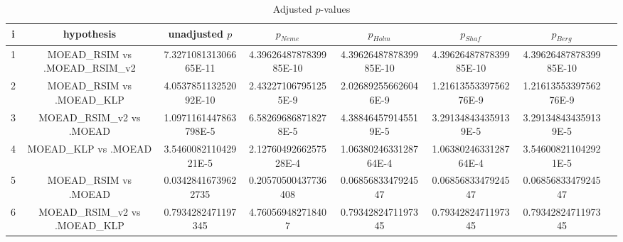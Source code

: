 \documentclass[a4paper,10pt]{article}
\begin{document}
\begin{landscape}
\begin{table}[!htp]
\centering\tiny
\caption{Adjusted $p$-values}
\begin{tabular}{cccccccc}
i&hypothesis&unadjusted $p$&$p_{Neme}$&$p_{Holm}$&$p_{Shaf}$&$p_{Berg}$\\
\hline
1&MOEAD_RSIM vs .MOEAD_RSIM_v2&7.327108131306665E-11&4.3962648787839985E-10&4.3962648787839985E-10&4.3962648787839985E-10&4.3962648787839985E-10\\
2&MOEAD_RSIM vs .MOEAD_KLP&4.053785113252092E-10&2.432271067951255E-9&2.026892556626046E-9&1.2161355339756276E-9&1.2161355339756276E-9\\
3&MOEAD_RSIM_v2 vs .MOEAD&1.0971161447863798E-5&6.582696868718278E-5&4.388464579145519E-5&3.291348434359139E-5&3.291348434359139E-5\\
4&MOEAD_KLP vs .MOEAD&3.546008211042921E-5&2.1276049266257528E-4&1.0638024633128764E-4&1.0638024633128764E-4&3.546008211042921E-5\\
5&MOEAD_RSIM vs .MOEAD&0.03428416739622735&0.20570500437736408&0.0685683347924547&0.0685683347924547&0.0685683347924547\\
6&MOEAD_RSIM_v2 vs .MOEAD_KLP&0.7934282471197345&4.760569482718407&0.7934282471197345&0.7934282471197345&0.7934282471197345\\
\hline
\end{tabular}
\end{table}

\end{landscape}
\end{document}
